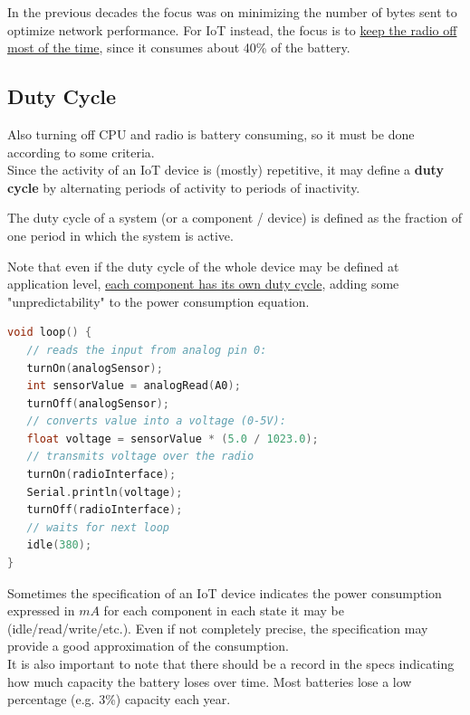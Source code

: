 In the previous decades the focus was on minimizing the number of bytes sent to optimize network performance.
For IoT instead, the focus is to \ul{keep the radio off most of the time}, since it consumes about 40\% of the battery.

\subsection{Duty Cycle}
Also turning off CPU and radio is battery consuming, so it must be done according to some criteria.\\
Since the activity of an IoT device is (mostly) repetitive, it may define a \textbf{duty cycle} by alternating periods of activity to periods of inactivity.
\begin{paracol}{2}
   
   The duty cycle of a system (or a component / device) is defined as the fraction of one period in which the system is active.

   Note that even if the duty cycle of the whole device may be defined at application level, \ul{each component has its own duty cycle}, adding some "unpredictability" to the power consumption equation. 
   \switchcolumn

   \begin{lstlisting}[language=C,otherkeywords = {turnOn,turnOff,idle,Serial}]
void loop() {
   // reads the input from analog pin 0:
   turnOn(analogSensor);
   int sensorValue = analogRead(A0);
   turnOff(analogSensor);
   // converts value into a voltage (0-5V):
   float voltage = sensorValue * (5.0 / 1023.0);
   // transmits voltage over the radio
   turnOn(radioInterface);
   Serial.println(voltage);
   turnOff(radioInterface);
   // waits for next loop
   idle(380);
}
   \end{lstlisting}
   
\end{paracol}


Sometimes the specification of an IoT device indicates the power consumption expressed in $mA$ for each component in each state it may be (idle/read/write/etc.).
Even if not completely precise, the specification may provide a good approximation of the consumption.\\
It is also important to note that there should be a record in the specs indicating how much capacity the battery loses over time. Most batteries lose a low percentage (e.g. 3\%) capacity each year.


